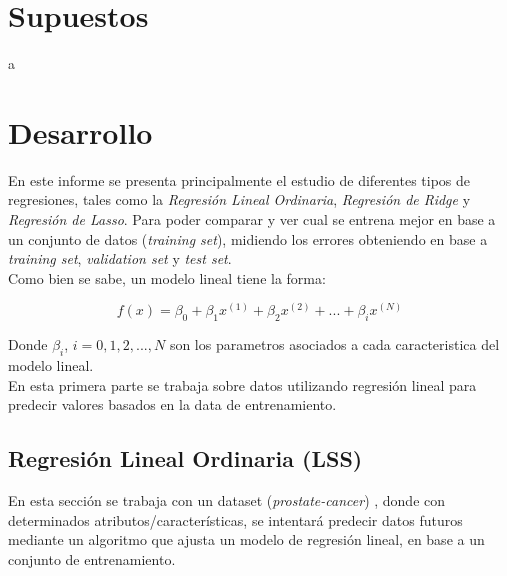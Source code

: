 \documentclass[10pt]{article}
\begin{document}
\section{Supuestos}

a\\

\section{Desarrollo}
En este informe se presenta principalmente el estudio de diferentes tipos de regresiones, tales como la \textit{Regresión Lineal Ordinaria}, \textit{Regresión de Ridge} y \textit{Regresión de Lasso}. Para poder comparar y ver cual se entrena mejor en base a un conjunto de datos (\textit{training set}), midiendo los errores obteniendo en base a \textit{training set}, \textit{validation set} y \textit{test set}.\\

Como bien se sabe, un modelo lineal tiene la forma:

\begin{equation}
f(x) = \beta_0 + \beta_1 x^{(1)} + \beta_2 x^{(2)} + ... + \beta_i x^{(N)}
\label{f_rlineal}
\end{equation}

Donde $\beta_i$, $i = 0, 1, 2,..., N$ son los parametros asociados a cada caracteristica del modelo lineal.\\

En esta primera parte se trabaja sobre datos utilizando regresión lineal para predecir valores basados en la data de entrenamiento.

\subsection{Regresión Lineal Ordinaria (LSS)}

En esta sección se trabaja con un dataset (\textit{prostate-cancer}) \cite{friedman2001elements}, donde con determinados atributos/características, se intentará predecir datos futuros mediante un algoritmo que ajusta un modelo de regresión lineal, en base a un conjunto de entrenamiento.
\end{document}
